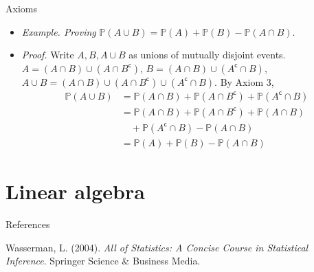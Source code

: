 \documentclass{beamer}
\begin{document}
\begin{frame}{Axioms}
    \begin{itemize}
        \item
        \textit{Example. Proving} $ \mathbb{P}(A \cup B) = \mathbb{P}(A) +
        \mathbb{P}(B) - \mathbb{P}(A \cap B) $.

        \item
        \textit{Proof.} Write $ A, B, A \cup B $ as unions of mutually disjoint
        events. $ A = (A \cap B) \cup (A \cap B^\mathsf{c}) $,
        $ B = (A \cap B) \cup (A^\mathsf{c} \cap B) $, $ A \cup B = (A \cap B)
        \cup (A \cap B^\mathsf{c}) \cup (A^\mathsf{c} \cap B) $. By Axiom 3,
        \begin{equation*}
            \begin{split}
                \mathbb{P}(A \cup B) & = \mathbb{P}(A \cap B) +
                \mathbb{P}(A \cap B^\mathsf{c}) +
                \mathbb{P}(A^\mathsf{c} \cap B) \\
                & = \mathbb{P}(A \cap B) + \mathbb{P}(A \cap B^\mathsf{c}) +
                \mathbb{P}(A \cap B) \\
                & \quad + \mathbb{P}(A^\mathsf{c} \cap B) -
                \mathbb{P}(A \cap B) \\
                & = \mathbb{P}(A) + \mathbb{P}(B) - \mathbb{P}(A \cap B)
            \end{split}
        \end{equation*}
    \end{itemize}
\end{frame}

\section{Linear algebra}

\begin{frame}{References}
    \begin{thebibliography}{99}
        Wasserman, L. (2004). \textit{All of Statistics: A Concise Course in
        Statistical Inference}. Springer Science \& Business Media.
    \end{thebibliography}
\end{frame}
\end{document}
